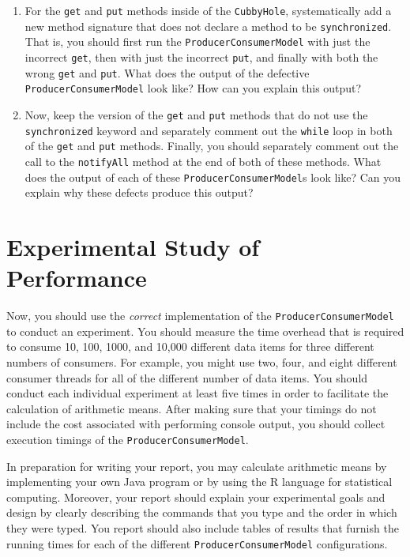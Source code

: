 \begin{enumerate}

  \item For the {\tt get} and {\tt put} methods inside of the {\tt CubbyHole}, systematically add a new method signature that does
    not declare a method to be {\tt synchronized}.  That is, you should first run the {\tt ProducerConsumerModel} with just the
    incorrect {\tt get}, then with just the incorrect {\tt put}, and finally with both the wrong {\tt get} and {\tt put}.   What
    does the output of the defective {\tt ProducerConsumerModel} look like?  How can you explain this output?  

  \item Now, keep the version of the {\tt get} and {\tt put} methods that do not use the {\tt synchronized} keyword and
    separately comment out the {\tt while} loop in both of the {\tt get} and {\tt put} methods.  Finally, you should separately
    comment out the call to the {\tt notifyAll} method at the end of both of these methods. What does the output of each of these
    {\tt ProducerConsumerModel}s look like? Can you explain why these defects produce this output?

\end{enumerate}

\section*{Experimental Study of Performance}

  Now, you should use the {\em correct} implementation of the {\tt ProducerConsumerModel} to conduct an experiment.  You should
  measure the time overhead that is required to consume 10, 100, 1000, and 10,000 different data items for three different numbers
  of consumers.  For example, you might use two, four, and eight different consumer threads for all of the different number of
  data items.  You should conduct each individual experiment at least five times in order to facilitate the calculation of
  arithmetic means.  After making sure that your timings do not include the cost associated with performing console output, you
  should collect execution timings of the {\tt ProducerConsumerModel}.  

  In preparation for writing your report, you may calculate arithmetic means by implementing your own Java program or by using the
  R language for statistical computing.  Moreover, your report should explain your experimental goals and design by clearly
  describing the commands that you type and the order in which they were typed.  You report should also include tables of results
  that furnish the running times for each of the different {\tt ProducerConsumerModel} configurations.  
  
